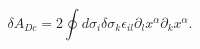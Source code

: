 \begin{equation}
\label{varadc}
\delta A_{Dc}=2\oint d\sigma_i\delta \sigma_k\epsilon_{il}\partial_lx^{\alpha}\partial_kx^{\alpha}.
\end{equation}

